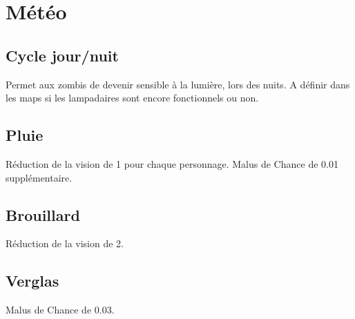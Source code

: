 \section{Météo}
\subsection{Cycle jour/nuit}
Permet aux zombis de devenir sensible à la lumière, lors des nuits. A définir dans les maps si les lampadaires sont encore fonctionnels ou non.
\subsection{Pluie}
Réduction de la vision de 1 pour chaque personnage. Malus de Chance de 0.01 supplémentaire.
\subsection{Brouillard}
Réduction de la vision de 2.
\subsection{Verglas}
Malus de Chance de 0.03.